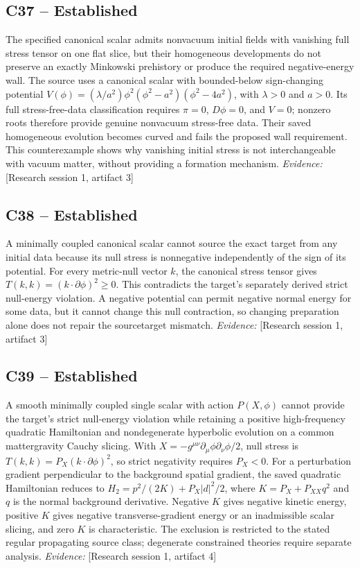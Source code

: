 \documentclass[11pt]{article}
\begin{document}
\begin{sloppypar}
\subsection{C37 -- Established}
The specified canonical scalar admits nonvacuum initial fields with vanishing full stress tensor on one flat slice, but their homogeneous developments do not preserve an exactly Minkowski prehistory or produce the required negative-energy wall.
The source uses a canonical scalar with bounded-below sign-changing potential $V(\phi)=(\lambda/a^2)\phi^2(\phi^2-a^2)(\phi^2-4a^2)$, with $\lambda>0$ and $a>0$. Its full stress-free-data classification requires $\pi=0$, $D\phi=0$, and $V=0$; nonzero roots therefore provide genuine nonvacuum stress-free data. Their saved homogeneous evolution becomes curved and fails the proposed wall requirement. This counterexample shows why vanishing initial stress is not interchangeable with vacuum matter, without providing a formation mechanism.
\textit{Evidence: }[Research session 1, artifact 3]
\subsection{C38 -- Established}
A minimally coupled canonical scalar cannot source the exact target from any initial data because its null stress is nonnegative independently of the sign of its potential.
For every metric-null vector $k$, the canonical stress tensor gives $T(k,k)=(k\cdot\partial\phi)^2\geq0$. This contradicts the target's separately derived strict null-energy violation. A negative potential can permit negative normal energy for some data, but it cannot change this null contraction, so changing preparation alone does not repair the source\textendash{}target mismatch.
\textit{Evidence: }[Research session 1, artifact 3]
\subsection{C39 -- Established}
A smooth minimally coupled single scalar with action $P(X,\phi)$ cannot provide the target's strict null-energy violation while retaining a positive high-frequency quadratic Hamiltonian and nondegenerate hyperbolic evolution on a common matter\textendash{}gravity Cauchy slicing.
With $X=-g^{\mu\nu}\partial_\mu\phi\partial_\nu\phi/2$, null stress is $T(k,k)=P_X(k\cdot\partial\phi)^2$, so strict negativity requires $P_X<0$. For a perturbation gradient perpendicular to the background spatial gradient, the saved quadratic Hamiltonian reduces to $H_2=p^2/(2K)+P_X|d|^2/2$, where $K=P_X+P_{XX}q^2$ and $q$ is the normal background derivative. Negative $K$ gives negative kinetic energy, positive $K$ gives negative transverse-gradient energy or an inadmissible scalar slicing, and zero $K$ is characteristic. The exclusion is restricted to the stated regular propagating source class; degenerate constrained theories require separate analysis.
\textit{Evidence: }[Research session 1, artifact 4]
\end{sloppypar}
\end{document}
